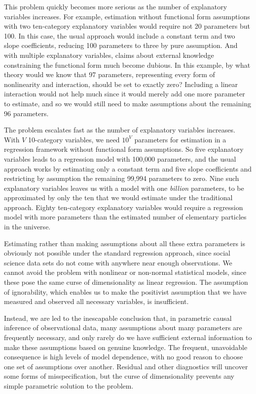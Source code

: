 \documentclass[11pt,titlepage]{article}
\begin{document}
This problem quickly becomes more serious as the number of explanatory
variables increases.  For example, estimation without functional form
assumptions with two ten-category explanatory variables would require
not 20 parameters but 100.  In this case, the usual approach would
include a constant term and two slope coefficients, reducing 100
parameters to three by pure assumption.  And with multiple explanatory
variables, claims about external knowledge constraining the functional
form much become dubious.  In this example, by what theory would we
know that 97 parameters, representing every form of nonlinearity and
interaction, should be set to exactly zero?  Including a linear
interaction would not help much since it would merely add one more
parameter to estimate, and so we would still need to make assumptions
about the remaining 96 parameters.

The problem escalates fast as the number of explanatory variables
increases.  With $V$ 10-category variables, we need $10^V$ parameters
for estimation in a regression framework without functional form
assumptions.  So five explanatory variables leads to a regression
model with 100,000 parameters, and the usual approach works by
estimating only a constant term and five slope coefficients and
restricting by assumption the remaining 99,994 parameters to zero.
Nine such explanatory variables leaves us with a model with one
\emph{billion} parameters, to be approximated by only the ten that we
would estimate under the traditional approach.  Eighty ten-category
explanatory variables would require a regression model with more
parameters than the estimated number of elementary particles in the
universe.

Estimating rather than making assumptions about all these extra
parameters is obviously not possible under the standard regression
approach, since social science data sets do not come with anywhere
near enough observations.  We cannot avoid the problem with nonlinear
or non-normal statistical models, since these pose the same curse of
dimensionality as linear regression.  The assumption of ignorability,
which enables us to make the positivist assumption that we have
measured and observed all necessary variables, is insufficient.

Instead, we are led to the inescapable conclusion that, in parametric
causal inference of observational data, many assumptions about many
parameters are frequently necessary, and only rarely do we have
sufficient external information to make these assumptions based on
genuine knowledge.  The frequent, unavoidable consequence is high
levels of model dependence, with no good reason to choose one set of
assumptions over another.  Residual and other diagnostics will uncover
some forms of misspecification, but the curse of dimensionality
prevents any simple parametric solution to the problem.
\end{document}
